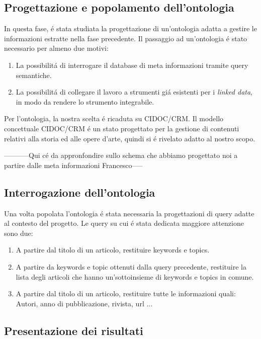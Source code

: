 \documentclass[11pt,a4paper]{article}
\begin{document}
\subsection{Progettazione e popolamento dell'ontologia}
\label{subsec:ontology}
In questa fase, \'e stata studiata la progettazione di un'ontologia adatta a gestire le informazioni estratte nella fase precedente. Il passaggio ad un'ontologia \'e stato necessario per almeno due motivi:
\begin{enumerate}
	\item La possibilit\'a di interrogare il database di meta informazioni tramite query semantiche.
	\item La possibilit\'a di collegare il lavoro a strumenti gi\'a esistenti per i \emph{linked data}, in modo da rendere lo strumento integrabile.
\end{enumerate}
Per l'ontologia, la nostra scelta \'e ricaduta su CIDOC/CRM\cite{CIDOC}. Il modello concettuale CIDOC/CRM \'e un stato progettato per la gestione di contenuti relativi alla storia ed alle opere d'arte, quindi si \'e rivelato adatto al nostro scopo. 




-----------Qui c\'e da appronfondire sullo schema che abbiamo progettato noi a partire dalle meta informazioni Francesco-----

\subsection{Interrogazione dell'ontologia}
\label{subsec:query}
Una volta popolata l'ontologia \'e stata necessaria la progettazioni di query adatte al contesto del progetto. Le query su cui \'e stata dedicata maggiore attenzione sono due:
\begin{enumerate}
	\item A partire dal titolo di un articolo, restituire  keywords e topics.
	\item A partire da keywords e topic ottenuti dalla query precedente, restituire la lista degli articoli che hanno un'sottoinsieme di keywords e topics in comune. 
	\item A partire dal titolo di un articolo, restituire tutte le informazioni quali: Autori, anno di pubblicazione, rivista, url ...
\end{enumerate}

\subsection{Presentazione dei risultati}
\label{subsec:results}
\end{document}
